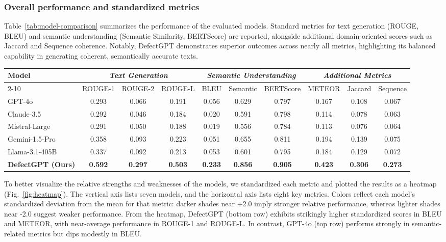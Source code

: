 \documentclass[a4paper,fleqn]{cas-sc}
\begin{document}
\subsubsection{Overall performance and standardized metrics}

Table~\ref{tab:model-comparison} summarizes the performance of the evaluated models. Standard metrics for text generation (ROUGE, BLEU) and semantic understanding (Semantic Similarity, BERTScore) are reported, alongside additional domain-oriented scores such as Jaccard and Sequence coherence. Notably, DefectGPT demonstrates superior outcomes across nearly all metrics, highlighting its balanced capability in generating coherent, semantically accurate texts.

\begin{table*}[t]
\centering
\setlength{\tabcolsep}{2.75pt}
\caption{Performance Comparison of Different Models on Building Inspection Task}
\label{tab:model-comparison}
\begin{tabular}{l|ccc|ccc|ccc}
\toprule
\multirow{2}{*}{\textbf{Model}} & \multicolumn{3}{c|}{\textit{Text Generation}} & \multicolumn{3}{c|}{\textit{Semantic Understanding}} & \multicolumn{3}{c}{\textit{Additional Metrics}} \\
\cmidrule{2-10}
 & ROUGE-1 & ROUGE-2 & ROUGE-L & BLEU & Semantic & BERTScore & METEOR & Jaccard & Sequence \\
\midrule
GPT-4o & 0.293 & 0.066 & 0.191 & 0.056 & 0.629 & 0.797 & 0.167 & 0.108 & 0.067 \\
Claude-3.5 & 0.292 & 0.046 & 0.184 & 0.020 & 0.591 & 0.798 & 0.114 & 0.078 & 0.063 \\
Mistral-Large & 0.291 & 0.050 & 0.188 & 0.019 & 0.556 & 0.784 & 0.113 & 0.076 & 0.064 \\
Gemini-1.5-Pro & 0.358 & 0.093 & 0.223 & 0.051 & 0.655 & 0.811 & 0.194 & 0.139 & 0.075 \\
Llama-3.1-405B & 0.337 & 0.092 & 0.213 & 0.053 & 0.601 & 0.795 & 0.184 & 0.129 & 0.072 \\
\midrule
\textbf{DefectGPT (Ours)} & \textbf{0.592} & \textbf{0.297} & \textbf{0.503} & \textbf{0.233} & \textbf{0.856} & \textbf{0.905} & \textbf{0.423} & \textbf{0.306} & \textbf{0.273} \\
\bottomrule
\end{tabular}
\end{table*}

To better visualize the relative strengths and weaknesses of the models, we standardized each metric and plotted the results as a heatmap (Fig.~\ref{fig:heatmap}). The vertical axis lists seven models, and the horizontal axis lists eight key metrics. Colors reflect each model's standardized deviation from the mean for that metric: darker shades near +2.0 imply stronger relative performance, whereas lighter shades near -2.0 suggest weaker performance. From the heatmap, DefectGPT (bottom row) exhibits strikingly higher standardized scores in BLEU and METEOR, with near-average performance in ROUGE-1 and ROUGE-L. In contrast, GPT-4o (top row) performs strongly in semantic-related metrics but dips modestly in BLEU.
\end{document}

